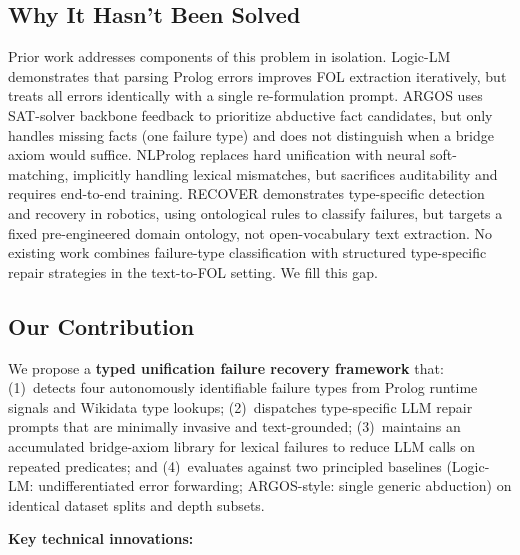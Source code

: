 \documentclass[11pt,letterpaper]{article}
\begin{document}
\subsection{Why It Hasn't Been Solved}

Prior work addresses components of this problem in isolation. Logic-LM \citep{Pan2023} demonstrates that parsing Prolog errors improves FOL extraction iteratively, but treats all errors identically with a single re-formulation prompt. ARGOS \citep{Cotnareanu2026} uses SAT-solver backbone feedback to prioritize abductive fact candidates, but only handles missing facts (one failure type) and does not distinguish when a bridge axiom would suffice. NLProlog \citep{Weber2019} replaces hard unification with neural soft-matching, implicitly handling lexical mismatches, but sacrifices auditability and requires end-to-end training. RECOVER \citep{Cornelio2024} demonstrates type-specific detection and recovery in robotics, using ontological rules to classify failures, but targets a fixed pre-engineered domain ontology, not open-vocabulary text extraction. No existing work combines failure-type classification with structured type-specific repair strategies in the text-to-FOL setting. We fill this gap.

\subsection{Our Contribution}

We propose a \textbf{typed unification failure recovery framework} that: (1)~detects four autonomously identifiable failure types from Prolog runtime signals and Wikidata type lookups; (2)~dispatches type-specific LLM repair prompts that are minimally invasive and text-grounded; (3)~maintains an accumulated bridge-axiom library for lexical failures to reduce LLM calls on repeated predicates; and (4)~evaluates against two principled baselines (Logic-LM: undifferentiated error forwarding; ARGOS-style: single generic abduction) on identical dataset splits and depth subsets.

\medskip\noindent\textbf{Key technical innovations:}
\end{document}
